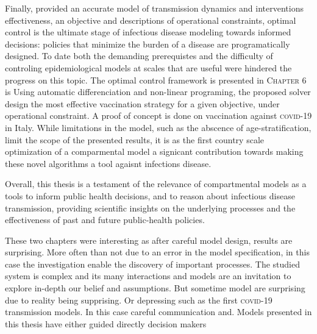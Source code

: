 Finally, provided an accurate model of transmission dynamics and interventions effectiveness, an objective and descriptions of operational constraints, optimal control is the ultimate stage of infectious disease modeling towards informed decisions: policies that minimize the burden of a disease are programatically designed. To date both the demanding prerequistes and the difficulty of controling epidemiological models at scales that are useful were hindered the progress on this topic. The optimal control framework is presented in \textsc{Chapter 6} is  Using automatic differenciation and non-linear programing, the proposed solver design the most effective vaccination strategy for a given objective, under operational constraint. A proof of concept is done on vaccination against \textsc{covid}-19 in Italy. While limitations in the model, such as the abscence of age-stratification, limit the scope of the presented results, it is as the first country scale optimization of a comparmental model  a signicant contribution towards making these novel algorithms a tool agaisnt infections disease.



Overall, this thesis is a testament of the relevance of compartmental models as a tools to inform public health decisions, and to reason about infectious disease transmission, providing scientific insights on the underlying processes and the effectiveness of past and future public-health policies. %

  These two chapters were interesting as after careful model design, results are surprising. More often than not due to an error in the model specification, in this case the investigation enable the discovery of important processes. The studied system is complex and its many interactions and models are an invitation to explore in-depth our belief and assumptions. But sometime model are surprising due to reality being supprising. Or depressing such as the first \textsc{covid}-19 transmission models. 
   In this case careful communication and. Models presented in this thesis have either guided directly decision makers



